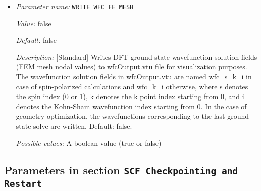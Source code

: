 \begin{itemize}
{\it Default:} false


{\it Description:} [Standard] Computes projected density of states on each atom using Lorentzians. Uses specified Temperature for SCF as the broadening parameter. Outputs a file name 'pdosData\_x' with x denoting atomID. This file contains columns with first column indicating the energy in eV and all other columns indicating projected density of states corresponding to single atom wavefunctions.


{\it Possible values:} A boolean value (true or false)
\item {\it Parameter name:} {\tt WRITE WFC FE MESH}
\label{parameters:Post_2dprocessing Options/WRITE WFC FE MESH}
\label{parameters:Post_2dprocessing_20Options/WRITE_20WFC_20FE_20MESH}


{\it Value:} false


{\it Default:} false


{\it Description:} [Standard] Writes DFT ground state wavefunction solution fields (FEM mesh nodal values) to wfcOutput.vtu file for visualization purposes. The wavefunction solution fields in wfcOutput.vtu are named wfc\_s\_k\_i in case of spin-polarized calculations and wfc\_k\_i otherwise, where s denotes the spin index (0 or 1), k denotes the k point index starting from 0, and i denotes the Kohn-Sham wavefunction index starting from 0. In the case of geometry optimization, the wavefunctions corresponding to the last ground-state solve are written.  Default: false.


{\it Possible values:} A boolean value (true or false)
\end{itemize}

\subsection{Parameters in section \tt SCF Checkpointing and Restart}
\label{parameters:SCF_20Checkpointing_20and_20Restart}

